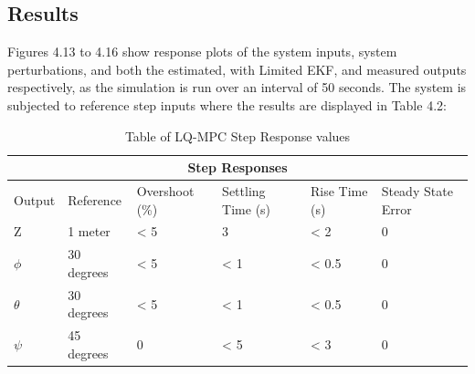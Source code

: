 \documentclass[12pt,a4paper,twoside]{report}
\begin{document}
			\subsection{Results}
				Figures 4.13 to 4.16 show response plots of the system inputs, system perturbations, and both the estimated, with Limited EKF, and measured outputs respectively, as the simulation is run over an interval of 50 seconds. The system is subjected to reference step inputs where the results are displayed in Table 4.2:
				\\
				\begin{table}[h!]
					\centering
					\begin{tabular}{ |p{1.5cm}|p{3cm}|p{2cm}|p{2cm}|p{2cm}|p{2cm}|  }
						\hline
						\multicolumn{6}{|c|}{Step Responses} \\
						\hline
						Output   &  Reference  & Overshoot (\%) & Settling Time (s) & Rise Time (s) & Steady State Error \\
						\hline
						Z        &  1 meter         & < 5 &  3   & < 2   & 0\\
						$\phi$   &  30 degrees      & < 5 & < 1  & < 0.5 & 0\\
						$\theta$ &  30 degrees      & < 5 & < 1  & < 0.5 & 0\\
						$\psi$   & 	45 degrees      & 0   & < 5  & < 3   & 0\\
						\hline
					\end{tabular}
					\caption{Table of LQ-MPC Step Response values}
					\label{table:lqmpcstepresponses}
				\end{table}
				
\end{document}
